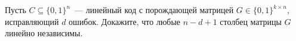 Пусть $C \subseteq \{0, 1\}^n$~--- линейный код с порождающей матрицей $G \in \{0, 1\}^{k \times n}$,
исправляющий $d$ ошибок. Докажите, что любые $n - d + 1$ столбец матрицы $G$ линейно независимы.
